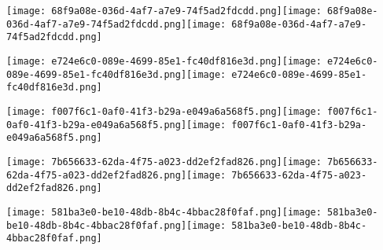 \documentclass[12pt]{article}
\begin{document}
\begin{labels}
        \hfill\texttt{[image: 68f9a08e-036d-4af7-a7e9-74f5ad2fdcdd.png]}\hfill\texttt{[image: 68f9a08e-036d-4af7-a7e9-74f5ad2fdcdd.png]}\hfill\texttt{[image: 68f9a08e-036d-4af7-a7e9-74f5ad2fdcdd.png]}\hfill\\

        \hfill\texttt{[image: e724e6c0-089e-4699-85e1-fc40df816e3d.png]}\hfill\texttt{[image: e724e6c0-089e-4699-85e1-fc40df816e3d.png]}\hfill\texttt{[image: e724e6c0-089e-4699-85e1-fc40df816e3d.png]}\hfill\\

        \hfill\texttt{[image: f007f6c1-0af0-41f3-b29a-e049a6a568f5.png]}\hfill\texttt{[image: f007f6c1-0af0-41f3-b29a-e049a6a568f5.png]}\hfill\texttt{[image: f007f6c1-0af0-41f3-b29a-e049a6a568f5.png]}\hfill\\

        \hfill\texttt{[image: 7b656633-62da-4f75-a023-dd2ef2fad826.png]}\hfill\texttt{[image: 7b656633-62da-4f75-a023-dd2ef2fad826.png]}\hfill\texttt{[image: 7b656633-62da-4f75-a023-dd2ef2fad826.png]}\hfill\\

        \hfill\texttt{[image: 581ba3e0-be10-48db-8b4c-4bbac28f0faf.png]}\hfill\texttt{[image: 581ba3e0-be10-48db-8b4c-4bbac28f0faf.png]}\hfill\texttt{[image: 581ba3e0-be10-48db-8b4c-4bbac28f0faf.png]}\hfill\\


\end{labels}
\end{document}
